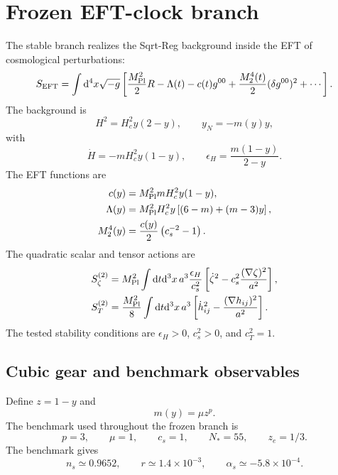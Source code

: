 \documentclass[11pt]{article}
\newcommand{\mpl}{M_{\rm Pl}}
\newcommand{\dd}{\mathrm{d}}
\begin{document}
\section{Frozen EFT-clock branch}\label{sec:engine}
The stable branch realizes the Sqrt-Reg background inside the EFT of cosmological perturbations:
\begin{equation}
S_{\rm EFT}=\int\dd^4x\sqrt{-g}\left[\frac{\mpl^2}{2}R-\Lambda(t)-c(t)g^{00}+\frac{M_2^4(t)}{2}(\delta g^{00})^2+\cdots\right].
\end{equation}
The background is
\begin{equation}
H^2=H_c^2y(2-y),\qquad y_N=-m(y)y,
\end{equation}
with
\begin{equation}
\dot H=-mH_c^2y(1-y),\qquad \epsilon_H=\frac{m(1-y)}{2-y}.
\end{equation}
The EFT functions are
\begin{align}
c(y)&=\mpl^2mH_c^2y(1-y),\\
\Lambda(y)&=\mpl^2H_c^2y\left[(6-m)+(m-3)y\right],\\
M_2^4(y)&=\frac{c(y)}{2}\left(c_s^{-2}-1\right).
\end{align}
The quadratic scalar and tensor actions are
\begin{align}
S_\zeta^{(2)}&=\mpl^2\int\dd t\dd^3x\,a^3\frac{\epsilon_H}{c_s^2}\left[\dot\zeta^2-c_s^2\frac{(\nabla\zeta)^2}{a^2}\right],\\
S_T^{(2)}&=\frac{\mpl^2}{8}\int\dd t\dd^3x\,a^3\left[\dot h_{ij}^2-\frac{(\nabla h_{ij})^2}{a^2}\right].
\end{align}
The tested stability conditions are $\epsilon_H>0$, $c_s^2>0$, and $c_T^2=1$.

\subsection{Cubic gear and benchmark observables}
Define $z=1-y$ and
\begin{equation}
m(y)=\mu z^p.
\end{equation}
The benchmark used throughout the frozen branch is
\begin{equation}
p=3,\qquad \mu=1,\qquad c_s=1,\qquad N_*=55,\qquad z_e=1/3.
\end{equation}
The benchmark gives
\begin{equation}
n_s\simeq0.9652,
\qquad
r\simeq1.4\times10^{-3},
\qquad
\alpha_s\simeq-5.8\times10^{-4}.
\end{equation}
\end{document}
